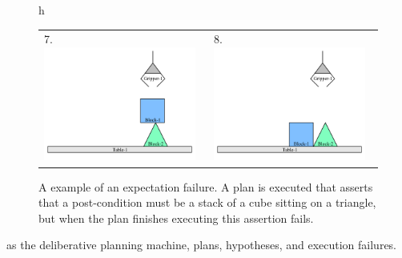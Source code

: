 \begin{figure}{h}
\begin{tabular}{p{5cm}p{5cm}}
    7. \includegraphics[width=5cm]{gfx/blocks_world_example-7}  & 8. \includegraphics[width=5cm]{gfx/blocks_world_example-8}
  \end{tabular}
  \caption[A example of an expectation failure.]{A example of an
    expectation failure.  A plan is executed that asserts that a
    post-condition must be a stack of a cube sitting on a triangle,
    but when the plan finishes executing this assertion fails.}
  \label{figure:failure_to_stack_cube_on_pyramid}
\end{figure}
as the deliberative planning machine, plans, hypotheses, and execution
failures.


